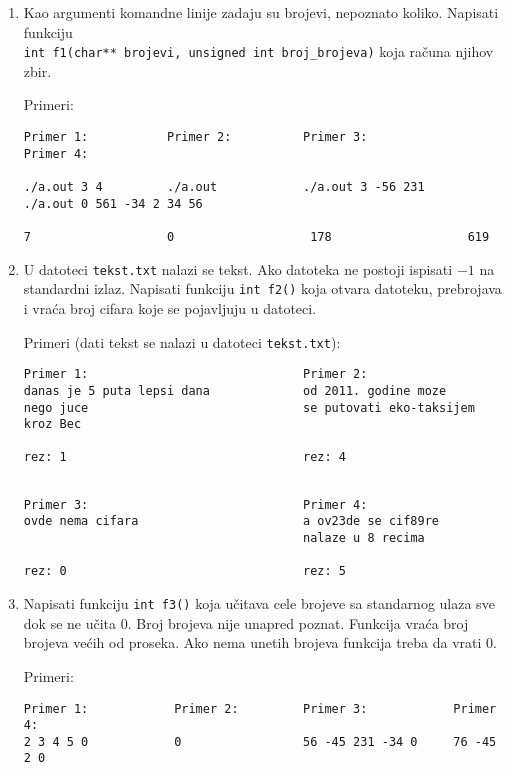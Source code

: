 \begin{enumerate}
\item
Kao argumenti komandne linije zadaju su brojevi, nepoznato koliko.
  Napisati funkciju \\ \verb|int f1(char** brojevi, unsigned int broj_brojeva)| koja ra\v cuna njihov zbir.

Primeri:
\begin{verbatim}
Primer 1:           Primer 2:          Primer 3:              Primer 4:

./a.out 3 4         ./a.out            ./a.out 3 -56 231      ./a.out 0 561 -34 2 34 56

7                   0                   178                   619
\end{verbatim}

\item
  U datoteci \verb|tekst.txt| nalazi se tekst. Ako datoteka ne postoji ispisati $-1$ na standardni izlaz.
  Napisati funkciju \verb|int f2()| koja otvara datoteku, prebrojava i vra\'ca broj cifara koje se pojavljuju
  u datoteci.


Primeri (dati tekst se nalazi u datoteci \verb|tekst.txt|):
\begin{verbatim}
Primer 1:                              Primer 2:
danas je 5 puta lepsi dana             od 2011. godine moze
nego juce                              se putovati eko-taksijem kroz Bec

rez: 1                                 rez: 4


\end{verbatim}

\begin{verbatim}
Primer 3:                              Primer 4:
ovde nema cifara                       a ov23de se cif89re
                                       nalaze u 8 recima

rez: 0                                 rez: 5
\end{verbatim}

\item
  Napisati funkciju \verb|int f3()| koja u\v citava
  cele brojeve sa standarnog ulaza sve dok se ne u\v cita 0. Broj brojeva nije unapred poznat. Funkcija vra\'ca
  broj brojeva ve\'cih od proseka. Ako nema unetih brojeva funkcija treba da vrati $0$.

Primeri:
\begin{verbatim}
Primer 1:            Primer 2:         Primer 3:            Primer 4:
2 3 4 5 0            0                 56 -45 231 -34 0     76 -45 2 0


\end{verbatim}
\end{enumerate}
